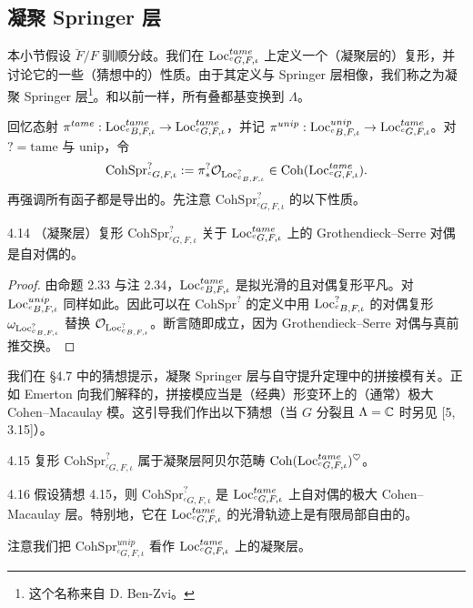 \subsection{凝聚 Springer 层}
本小节假设 $\breve F/F$ 驯顺分歧。我们在 $\operatorname{Loc}^{tame}_{{}^cG,F,\iota}$ 上定义一个（凝聚层的）复形，并讨论它的一些（猜想中的）性质。由于其定义与 Springer 层相像，我们称之为凝聚 Springer 层\footnote{这个名称来自 D. Ben-Zvi。}。和以前一样，所有叠都基变换到 $\Lambda$。

回忆态射 $\pi^{tame}:\operatorname{Loc}^{tame}_{{}^cB,F,\iota}\to\operatorname{Loc}^{tame}_{{}^cG,F,\iota}$，并记 $\pi^{unip}:\operatorname{Loc}^{unip}_{{}^cB,F,\iota}\to\operatorname{Loc}^{tame}_{{}^cG,F,\iota}$。对 $?=\mathrm{tame}$ 与 $\mathrm{unip}$，令
\[
\mathrm{CohSpr}^?_{{}^cG,F,\iota}:=\pi^?_*\mathcal{O}_{\operatorname{Loc}^?_{{}^cB,F,\iota}}\in\operatorname{Coh}(\operatorname{Loc}^{tame}_{{}^cG,F,\iota}).
\]
再强调所有函子都是导出的。先注意 $\mathrm{CohSpr}^?_{{}^cG,F,\iota}$ 的以下性质。

\begin{prop}{4.14}
（凝聚层）复形 $\mathrm{CohSpr}^?_{{}^cG,F,\iota}$ 关于 $\operatorname{Loc}^{tame}_{{}^cG,F,\iota}$ 上的 Grothendieck–Serre 对偶是自对偶的。
\end{prop}

\begin{proof}
由命题 2.33 与注 2.34，$\operatorname{Loc}^{tame}_{{}^cB,F,\iota}$ 是拟光滑的且对偶复形平凡。对 $\operatorname{Loc}^{unip}_{{}^cB,F,\iota}$ 同样如此。因此可以在 $\mathrm{CohSpr}^?$ 的定义中用 $\operatorname{Loc}^?_{{}^cB,F,\iota}$ 的对偶复形 $\omega_{\operatorname{Loc}^?_{{}^cB,F,\iota}}$ 替换 $\mathcal{O}_{\operatorname{Loc}^?_{{}^cB,F,\iota}}$。断言随即成立，因为 Grothendieck–Serre 对偶与真前推交换。
\end{proof}

我们在 §4.7 中的猜想提示，凝聚 Springer 层与自守提升定理中的拼接模有关。正如 Emerton 向我们解释的，拼接模应当是（经典）形变环上的（通常）极大 Cohen–Macaulay 模。这引导我们作出以下猜想（当 $G$ 分裂且 $\Lambda=\mathbb{C}$ 时另见 [5, 3.15]）。

\begin{conj}{4.15}
复形 $\mathrm{CohSpr}^?_{{}^cG,F,\iota}$ 属于凝聚层阿贝尔范畴 $\operatorname{Coh}(\operatorname{Loc}^{tame}_{{}^cG,F,\iota})^{\heartsuit}$。
\end{conj}

\begin{cor}{4.16}
假设猜想 4.15，则 $\mathrm{CohSpr}^?_{{}^cG,F,\iota}$ 是 $\operatorname{Loc}^{tame}_{{}^cG,F,\iota}$ 上自对偶的极大 Cohen–Macaulay 层。特别地，它在 $\operatorname{Loc}^{tame}_{{}^cG,F,\iota}$ 的光滑轨迹上是有限局部自由的。
\end{cor}

注意我们把 $\mathrm{CohSpr}^{unip}_{{}^cG,F,\iota}$ 看作 $\operatorname{Loc}^{tame}_{{}^cG,F,\iota}$ 上的凝聚层。

